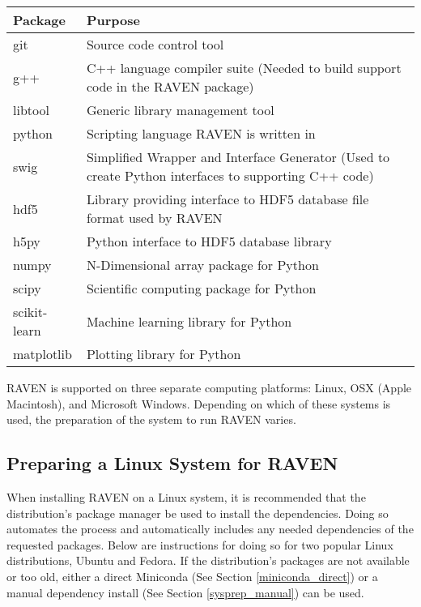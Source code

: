 \begin{center}
    \begin{tabular}{ | l | p{10cm} |}
    \hline Package & Purpose \\
    \hline git & Source code control tool \\
    \hline g++ & C++ language compiler suite (Needed to build
        support code in the RAVEN package) \\
    \hline libtool & Generic library management tool \\
    \hline python & Scripting language RAVEN is written in \\
    \hline swig & Simplified Wrapper and Interface Generator
        (Used to create Python interfaces to supporting C++ code) \\
    \hline hdf5 & Library providing interface to HDF5 database
        file format used by RAVEN \\
    \hline h5py & Python interface to HDF5 database library \\
    \hline numpy & N-Dimensional array package for Python \\
    \hline scipy &  Scientific computing package for Python \\
    \hline scikit-learn & Machine learning library for Python \\
    \hline matplotlib & Plotting library for Python \\
    \hline
    \end{tabular}
\end{center}


RAVEN is supported on three separate computing platforms:
Linux, OSX (Apple Macintosh), and Microsoft Windows.  Depending
on which of these systems is used, the preparation of the system
to run RAVEN varies.

\subsection{Preparing a Linux System for RAVEN}
\label{sysprep_linux}

When installing RAVEN on a Linux system, it is recommended that the
distribution's package manager be used to install the dependencies.
Doing so automates the process and automatically includes any needed
dependencies of the requested packages.  Below are instructions for
doing so for two popular Linux distributions, Ubuntu and Fedora.  If
the distribution's packages are not available or too old, either a
direct Miniconda (See Section \ref{miniconda_direct}) or a manual
dependency install (See Section \ref{sysprep_manual}) can be used.

